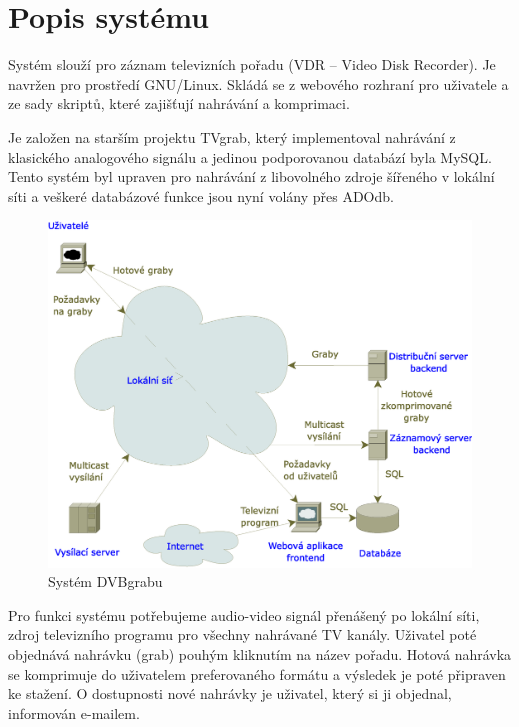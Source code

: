 \chapter{Popis systému}
Systém slouží pro záznam televizních pořadu (VDR -- Video Disk Recorder). Je navržen pro prostředí GNU/Linux. Skládá se z webového rozhraní pro uživatele a ze sady skriptů, které zajišťují nahrávání a komprimaci.

Je založen na starším projektu TVgrab, který implementoval nahrávání z klasického analogového signálu a jedinou podporovanou databází byla MySQL. Tento systém byl upraven pro nahrávání z libovolného zdroje šířeného v lokální síti a veškeré databázové funkce jsou nyní volány přes ADOdb.

\begin{figure}[ht]
\begin{center}
\includegraphics[width=15cm]{images/dvbgrab.eps}
\caption{Systém DVBgrabu}
\label{fig:overview}
\end{center}
\end{figure}

Pro funkci systému potřebujeme audio-video signál přenášený po lokální síti, zdroj televizního programu pro všechny nahrávané TV kanály. Uživatel poté objednává nahrávku (grab) pouhým kliknutím na název pořadu. Hotová nahrávka se komprimuje do uživatelem preferovaného formátu a výsledek je poté připraven ke stažení. O dostupnosti nové nahrávky je uživatel, který si ji objednal, informován e-mailem.
\vfill
\pagebreak

